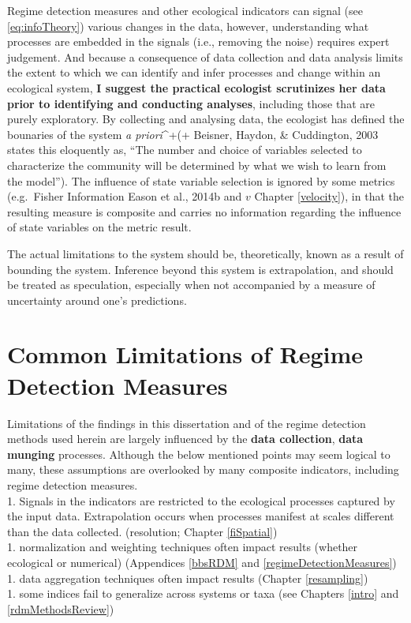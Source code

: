 \documentclass[12pt,twoside,openany]{reedthesis}
\begin{document}
Regime detection measures and other ecological indicators can signal (see \eqref{eq:infoTheory}) various changes in the data, however, understanding what processes are embedded in the signals (i.e., removing the noise) requires expert judgement. And because a consequence of data collection and data analysis limits the extent to which we can identify and infer processes and change within an ecological system, \textbf{I suggest the practical ecologist scrutinizes her data prior to identifying and conducting analyses}, including those that are purely exploratory. By collecting and analysing data, the ecologist has defined the bounaries of the system \emph{a priori}\^{}+(+ Beisner, Haydon, \& Cuddington, 2003 states this eloquently as, ``The number and choice of variables selected to characterize the community will be determined by what we wish to learn from the model''). The influence of state variable selection is ignored by some metrics (e.g.~Fisher Information Eason et al., 2014b and \(v\) Chapter \ref{velocity}), in that the resulting measure is composite and carries no information regarding the influence of state variables on the metric result.

The actual limitations to the system should be, theoretically, known as a result of bounding the system. Inference beyond this system is extrapolation, and should be treated as speculation, especially when not accompanied by a measure of uncertainty around one's predictions.

\hypertarget{common-limitations-of-regime-detection-measures}{%
\section{Common Limitations of Regime Detection Measures}\label{common-limitations-of-regime-detection-measures}}

Limitations of the findings in this dissertation and of the regime detection methods used herein are largely influenced by the \textbf{data collection}, \textbf{data munging} processes. Although the below mentioned points may seem logical to many, these assumptions are overlooked by many composite indicators, including regime detection measures.\\
1. Signals in the indicators are restricted to the ecological processes captured by the input data. Extrapolation occurs when processes manifest at scales different than the data collected. (resolution; Chapter \ref{fiSpatial})\\
1. normalization and weighting techniques often impact results (whether ecological or numerical) (Appendices \ref{bbsRDM} and \ref{regimeDetectionMeasures})\\
1. data aggregation techniques often impact results (Chapter \ref{resampling})\\
1. some indices fail to generalize across systems or taxa (see Chapters \ref{intro} and \ref{rdmMethodsReview})
\end{document}

